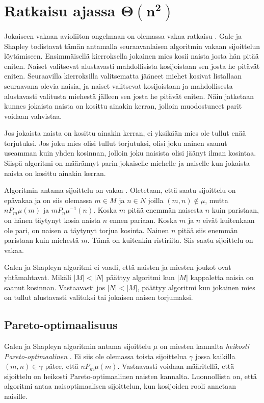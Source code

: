 \documentclass[gradu, twoside]{tktltiki}
\begin{document}
\section{Ratkaisu ajassa $\boldsymbol{\Theta(n^2)}$}

Jokaiseen vakaan avioliiton ongelmaan on olemassa vakaa ratkaisu
\cite{galeshapley62}. Gale ja Shapley todistavat tämän antamalla
seuraavanlaisen algoritmin vakaan sijoittelun löytämiseen.
Ensimmäisellä kierroksella jokainen mies kosii naista josta hän pitää
eniten. Naiset valitsevat alustavasti mahdollisista kosijoistaan sen
josta he pitävät eniten. Seuraavilla kierroksilla valitsematta jääneet
miehet kosivat listallaan seuraavana olevia naisia, ja naiset
valitsevat kosijoistaan ja mahdollisesta alustavasti valitusta
miehestä jälleen sen josta he pitävät eniten. Näin jatketaan kunnes
jokaista naista on kosittu ainakin kerran, jolloin muodostuneet parit
voidaan vahvistaa.

Jos jokaista naista on kosittu ainakin kerran, ei yksikään mies ole
tullut enää torjutuksi. Jos joku mies olisi tullut torjutuksi, olisi
joku nainen saanut useamman kuin yhden kosinnan, jolloin joku naisista
olisi jäänyt ilman kosintaa. Siispä algoritmi on määrännyt parin
jokaiselle miehelle ja naiselle kun jokaista naista on kosittu ainakin
kerran.

Algoritmin antama sijoittelu on vakaa \cite{galeshapley62}. Oletetaan,
että saatu sijoittelu on epävakaa ja on siis olemassa $m \in M$ ja $n
\in N$ joilla $(m, n) \notin \mu$, mutta $nP_m\mu(m)$ ja
$mP_n\mu^{-1}(n)$. Koska $m$ pitää enemmän naisesta $n$ kuin
paristaan, on hänen täytynyt kosia naista $n$ ennen pariaan. Koska $m$
ja $n$ eivät kuitenkaan ole pari, on naisen $n$ täytynyt torjua
kosinta. Nainen $n$ pitää siis enemmän paristaan kuin miehestä $m$.
Tämä on kuitenkin ristiriita. Siis saatu sijoittelu on vakaa.

Galen ja Shapleyn algoritmi ei vaadi, että naisten ja miesten joukot
ovat yhtämahtavat. Mikäli $|M| < |N|$ päättyy algoritmi kun $|M|$
kappaletta naisia on saanut kosinnan. Vastaavasti jos $|N| < |M|$,
päättyy algoritmi kun jokainen mies on tullut alustavasti valituksi
tai jokaisen naisen torjumaksi. \cite{galeshapley62}

\subsection{Pareto-optimaalisuus}

Galen ja Shapleyn algoritmin antama sijoittelu $\mu$ on miesten
kannalta \emph{heikosti Pareto-optimaalinen} \cite{gusfield89}. Ei
siis ole olemassa toista sijoittelua $\gamma$ jossa kaikilla $(m, n)
\in \gamma$ pätee, että $nP_m\mu(m)$. Vastaavasti voidaan määritellä,
että sijoittelu on heikosti Pareto-optimaalinen naisten kannalta.
Luonnollista on, että algoritmi antaa naisoptimaalisen sijoittelun,
kun kosijoiden rooli annetaan naisille.
\end{document}
